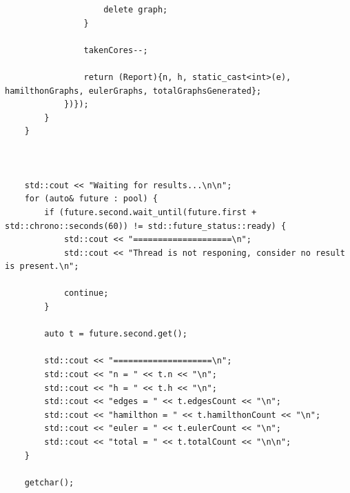 \documentclass[a4paper,14pt]{extarticle}
\begin{document}
\begin{enumerate}[1.]
\begin{verbatim}
                    delete graph;
                }

                takenCores--;

                return (Report){n, h, static_cast<int>(e), hamilthonGraphs, eulerGraphs, totalGraphsGenerated};
            })});
        }
    }



    std::cout << "Waiting for results...\n\n";
    for (auto& future : pool) {
        if (future.second.wait_until(future.first + std::chrono::seconds(60)) != std::future_status::ready) {
            std::cout << "====================\n";
            std::cout << "Thread is not responing, consider no result is present.\n";

            continue;
        }

        auto t = future.second.get();

        std::cout << "====================\n";
        std::cout << "n = " << t.n << "\n";
        std::cout << "h = " << t.h << "\n";
        std::cout << "edges = " << t.edgesCount << "\n";
        std::cout << "hamilthon = " << t.hamilthonCount << "\n";
        std::cout << "euler = " << t.eulerCount << "\n";
        std::cout << "total = " << t.totalCount << "\n\n";
    }

    getchar();


\end{verbatim}
\end{enumerate}
\end{document}
